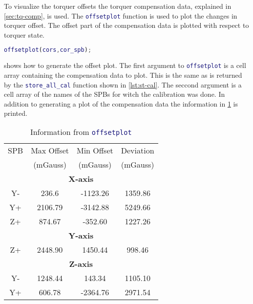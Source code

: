 To visualize the torquer offsets the torquer compensation data, explained in \cref{sec:tq-comp}, is used. The \lstinline[style=code,language=Matlab]$offsetplot$ function is used to plot the changes in torquer offset. The offset part of the compensation data is plotted with respect to torquer state.

\begin{lstlisting}[style=code,caption={Plotting torquer offsets from compensation data},label={lst:off-plot},language=Matlab]
offsetplot(cors,cor_spb);
\end{lstlisting}

 shows how to generate the offset plot. The first argument to \lstinline[style=code,language=Matlab]$offsetplot$ is a cell array containing the compensation data to plot. This is the same as is returned by the \lstinline[style=code,language=Matlab]$store_all_cal$ function shown in \cref{lst:st-cal}. The seccond argument is a cell array of the names of the \acp{SPB} for witch the calibration was done. In addition to generating a plot of the compensation data the information in \cref{tab:off-stat} is printed.

\begin{table}[!ht]
    \centering
    \caption{Information from \lstinline[style=code,language=Matlab]$offsetplot$}
    \label{tab:off-stat}
    \begin{tabular}{|c|c|c|c|}
        \hline
        \acs{SPB}&Max Offset&Min Offset&Deviation\\
        &(mGauss)&(mGauss)&(mGauss)\\
        \hline
        \multicolumn{4}{|c|}{\bfseries X-axis}\\
        \hline
        Y-&236.6&-1123.26&1359.86\\
        \hline
        Y+&2106.79&-3142.88&5249.66\\
        \hline
        Z+&874.67&-352.60&1227.26\\
        \hline
        \multicolumn{4}{|c|}{\bfseries Y-axis}\\
        \hline
        Z+&2448.90&1450.44&998.46\\
        \hline
        \multicolumn{4}{|c|}{\bfseries Z-axis}\\
        \hline
        Y-&1248.44&143.34&1105.10\\
        \hline
        Y+&606.78&-2364.76&2971.54\\
        \hline
    \end{tabular}
\end{table}

